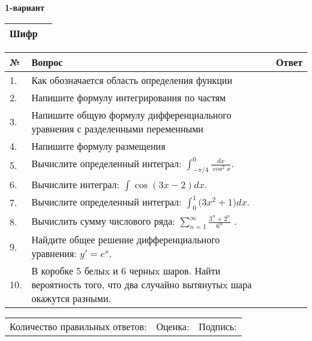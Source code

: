 \documentclass{article}
\begin{document}


  \textbf{1-вариант}\\
  
  \bgroup
  \def\arraystretch{1.6} %
  
  \begin{tabular}{|m{5.7cm}|m{9.5cm}|}
  \hline
  Шифр & \\
  \hline
  \end{tabular}
  
  \vspace{1cm}
  
  \begin{tabular}{|m{0.7cm}|m{10cm}|m{4cm}|}
  \hline
  № & Вопрос & Ответ \\
  \hline
  1. & Как обозначается область определения функции &  \\
  \hline
  2. & Напишите формулу интегрирования по частям &  \\
  \hline
  3. & Напишите общую формулу дифференциального уравнения с разделенными переменными &  \\
  \hline
  4. & Напишите формулу размещения &  \\
  \hline
  5. & Вычислите определенный интеграл: \(\int_{-\pi/4}^{0}\frac{dx}{\cos^2x}\). &  \\
  \hline
  6. & Вычислите интеграл: \(\int{\cos(3x - 2)dx}\). &  \\
  \hline
  7. & Вычислите определенный интеграл: \(\int_{0}^{1}{(3x^{2}} + 1)dx\). &  \\
  \hline
  8. & Вычислить сумму числового ряда: \(\sum_{n = 1}^{\infty}\frac{3^{n} + 2^{n}}{6^{n}}\) . &  \\
  \hline
  9. & Найдите общее решение дифференциального уравнения: \(y' = e^{x}\). &  \\
  \hline
  10. & В коробке 5 белыx и 6 черныx шаров. Найти вероятность того, что два случайно вытянутыx шара окажутся разными. &  \\
  \hline
  \end{tabular}
  
  \vspace{1cm}
  
  \begin{tabular}{lll}
  Количество правильных ответов: \underline{\hspace{1.5cm}} & 
  Оценка: \underline{\hspace{1.5cm}} & 
  Подпись: \underline{\hspace{2cm}} \\
  \end{tabular}
  
\end{document}
